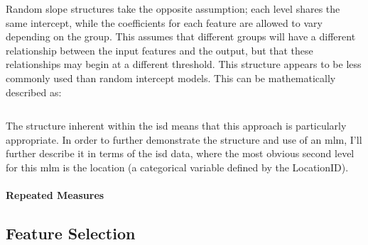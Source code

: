 Random slope structures take the opposite assumption; each level shares the same intercept, while the coefficients for each feature are allowed to vary depending on the group. This assumes that different groups will have a different relationship between the input features and the output, but that these relationships may begin at a different threshold. This structure appears to be less commonly used than random intercept models. This can be mathematically described as:

\begin{equation}
\end{equation}



The structure inherent within the \gls{isd} means that this approach is particularly appropriate. In order to further demonstrate the structure and use of an \gls{mlm}, I'll further describe it in terms of the \gls{isd} data, where the most obvious second level for this \gls{mlm} is the location (a categorical variable defined by the LocationID). 


\paragraph*{Repeated Measures}


 \subsection{Feature Selection}

